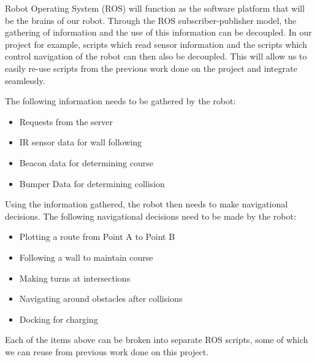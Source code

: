 \documentclass[12pt]{report}
\begin{document}
Robot Operating System (ROS) will function as the software platform that will be the brains of our robot. Through the ROS subscriber-publisher model, the gathering of information and the use of this information can be decoupled. In our project for example, scripts which read sensor information and the scripts which control navigation of the robot can then also be decoupled. This will allow us to easily re-use scripts from the previous work done on the project and integrate seamlessly.

The following information needs to be gathered by the robot:
\begin{itemize}
\itemsep0em 
\item Requests from the server
\item IR sensor data for wall following
\item Beacon data for determining course
\item Bumper Data for determining collision
\end{itemize}

Using the information gathered, the robot then needs to make navigational decisions. The following navigational decisions need to be made by the robot:
\begin{itemize}
\itemsep0em 
\item Plotting a route from Point A to Point B
\item Following a wall to maintain course
\item Making turns at intersections
\item Navigating around obstacles after collisions
\item Docking for charging
\end{itemize}

Each of the items above can be broken into separate ROS scripts, some of which we can reuse from previous work done on this project.
\end{document}
